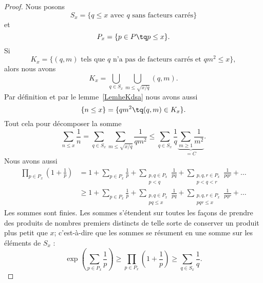 \begin{proof}
	Nous posons
	\begin{equation}
		S_x=\{  q\leq x\text{ avec } q\text{ sans facteurs carrés} \}
	\end{equation}
	et
	\begin{equation}
		P_x=\{ p\in P\tq p\leq x \}.
	\end{equation}
	Si
	\begin{equation}
		K_x=\{  (q,m)\text{ tels que } q\text{ n'a pas de facteurs carrés et } qm^2\leq x \},
	\end{equation}
	alors nous avons
	\begin{equation}
		K_x=\bigcup_{q\in S_x}\bigcup_{m\leq \sqrt{x/q}}(q,m).
	\end{equation}
	Par définition et par le lemme~\ref{LemheKdsa} nous avons aussi
	\begin{equation}
		\{ n\leq x \}=\{ qm^2\tq (q,m)\in K_x \}.
	\end{equation}
	Tout cela pour décomposer la somme
	\begin{equation}        \label{EqpoJpuC}
		\sum_{n\leq x}\frac{1}{ n }=\sum_{q\in S_x}\sum_{m\leq\sqrt{x/q}}\frac{1}{ qm^2 }\leq \sum_{q\in S_x}\frac{1}{ q }\underbrace{\sum_{m\geq 1}\frac{1}{ m^2 }}_{=C}.
	\end{equation}
	Nous avons aussi
	\begin{subequations}
		\begin{align}
			\prod_{p\in P_x}\left( 1+\frac{1}{ p } \right) & =1+\sum_{p\in P_x}\frac{1}{ p }+\sum_{\substack{p,q\in P_x     \\p<q}}\frac{1}{ pq }+\sum_{\substack{p,q,r\in P_x\\p<q<r}}\frac{1}{ pqr }+\ldots\\
			                                               & \geq 1+\sum_{p\in P_x}\frac{1}{ p }+\sum_{\substack{p,q\in P_x \\pq\leq x}}\frac{1}{ pq }+\sum_{\substack{p,q,r\in P_x\\pqr\leq x}}\frac{1}{ pqr }+\ldots
		\end{align}
	\end{subequations}
	Les sommes sont finies. Les sommes s'étendent sur toutes les façons de prendre des produits de nombres premiers distincts de telle sorte de conserver un produit plus petit que \( x\); c'est-à-dire que les sommes se résument en une somme sur les éléments de \( S_x\) :
	\begin{equation}        \label{EqooilOz}
		\exp\left( \sum_{p\in P_x}\frac{1}{ p } \right)\geq\prod_{p\in P_x}\left( 1+\frac{1}{ p } \right)\geq \sum_{q\in S_x}\frac{1}{ q }.

\end{equation}
\end{proof}
